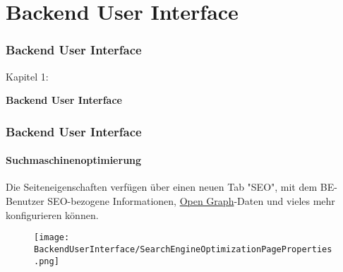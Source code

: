 %

\section{Backend User Interface}
\begin{frame}[fragile]
	\frametitle{Backend User Interface}

	\begin{center}\huge{Kapitel 1:}\end{center}
	\begin{center}\huge{\color{typo3darkgrey}\textbf{Backend User Interface}}\end{center}

\end{frame}


\begin{frame}[fragile]
	\frametitle{Backend User Interface}
	\framesubtitle{Suchmaschinenoptimierung}

	Die Seiteneigenschaften verfügen über einen neuen Tab "SEO", mit dem BE-Benutzer 
	SEO-bezogene Informationen, \href{http://ogp.me/}{Open Graph}-Daten und vieles mehr konfigurieren können.

	\begin{figure}
		\texttt{[image: BackendUserInterface/SearchEngineOptimizationPageProperties.png]}
	\end{figure}

\end{frame}


